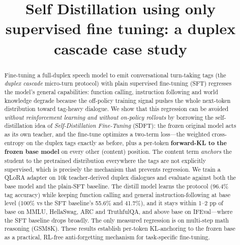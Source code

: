 \documentclass[conference]{IEEEtran}
\begin{document}
\title{Self Distillation using only supervised fine tuning: a duplex cascade case study}

\author{
\IEEEauthorblockA{}
}

\maketitle

\begin{abstract}
Fine-tuning a full-duplex speech model to emit conversational turn-taking tags
(the \emph{duplex cascade} micro-turn protocol) with plain supervised fine-tuning
(SFT) regresses the model's general capabilities: function calling, instruction
following and world knowledge degrade because the off-policy training signal
pushes the whole next-token distribution toward tag-heavy dialogue. We show that
this regression can be avoided \emph{without reinforcement learning and without
on-policy rollouts} by borrowing the self-distillation idea of
\emph{Self-Distillation Fine-Tuning} (SDFT): the frozen original model acts as its
own teacher, and the fine-tune optimizes a two-term loss---the weighted
cross-entropy on the duplex tags exactly as before, plus a per-token
\textbf{forward-KL to the frozen base model} on every other (content) position.
The content term \emph{anchors} the student to the pretrained distribution
everywhere the tags are not explicitly supervised, which is precisely the
mechanism that prevents regression. We train a QLoRA adapter on 10k teacher-derived
duplex dialogues and evaluate against both the base model and the plain-SFT
baseline. The distill model learns the protocol (96.4\% tag accuracy) while keeping
function calling and general instruction-following at base level (100\% vs the SFT
baseline's 55.6\% and 41.7\%), and it stays within 1--2 pp of base on MMLU, HellaSwag,
ARC and TruthfulQA, and above base on IFEval---where the SFT baseline drops broadly.
The only measured regression is on multi-step math reasoning (GSM8K). These results
establish per-token KL-anchoring to the frozen base as a practical, RL-free
anti-forgetting mechanism for task-specific fine-tuning.


\end{abstract}
\end{document}
